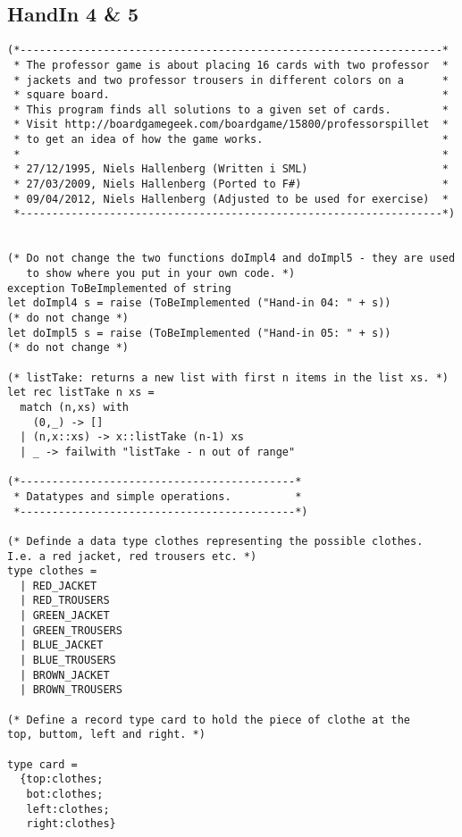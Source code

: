 \subsection{HandIn 4 \& 5}
\label{Appendix_FSharp_Grooss_4and5}
\begin{lstlisting}
(*------------------------------------------------------------------*
 * The professor game is about placing 16 cards with two professor  *
 * jackets and two professor trousers in different colors on a      *
 * square board.                                                    *
 * This program finds all solutions to a given set of cards.        *
 * Visit http://boardgamegeek.com/boardgame/15800/professorspillet  *
 * to get an idea of how the game works.                            *
 *                                                                  *
 * 27/12/1995, Niels Hallenberg (Written i SML)                     *
 * 27/03/2009, Niels Hallenberg (Ported to F#)                      *
 * 09/04/2012, Niels Hallenberg (Adjusted to be used for exercise)  *
 *------------------------------------------------------------------*)


(* Do not change the two functions doImpl4 and doImpl5 - they are used
   to show where you put in your own code. *)
exception ToBeImplemented of string
let doImpl4 s = raise (ToBeImplemented ("Hand-in 04: " + s)) 
(* do not change *)
let doImpl5 s = raise (ToBeImplemented ("Hand-in 05: " + s)) 
(* do not change *)

(* listTake: returns a new list with first n items in the list xs. *)
let rec listTake n xs = 
  match (n,xs) with
    (0,_) -> []
  | (n,x::xs) -> x::listTake (n-1) xs  
  | _ -> failwith "listTake - n out of range"

(*-------------------------------------------*
 * Datatypes and simple operations.          *
 *-------------------------------------------*)

(* Definde a data type clothes representing the possible clothes. 
I.e. a red jacket, red trousers etc. *)
type clothes = 
  | RED_JACKET
  | RED_TROUSERS
  | GREEN_JACKET  
  | GREEN_TROUSERS
  | BLUE_JACKET  
  | BLUE_TROUSERS
  | BROWN_JACKET  
  | BROWN_TROUSERS

(* Define a record type card to hold the piece of clothe at the 
top, buttom, left and right. *)

type card = 
  {top:clothes;
   bot:clothes;
   left:clothes;
   right:clothes}


\end{lstlisting}
